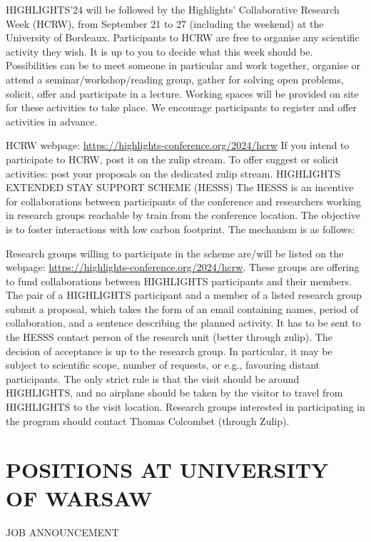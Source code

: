 \documentclass[prodmode,acmtecs]{acmsmall} %
\begin{document}
\begin{itemize}
  HIGHLIGHTS’24 will be followed by the Highlights’ Collaborative Research Week (HCRW), from September 21 to 27 (including the weekend) at the University of Bordeaux. Participants to HCRW are free to organise any scientific activity they wish. It is up to you to decide what this week should be. Possibilities can be to meet someone in particular and work together, organise or attend a seminar/workshop/reading group, gather for solving open problems, solicit, offer and participate in a lecture. Working spaces will be provided on site for these activities to take place. We encourage participants to register and offer activities in advance. 
 
  HCRW webpage: \href{https://highlights-conference.org/2024/hcrw}{https://highlights-conference.org/2024/hcrw} If you intend to participate to HCRW, post it on the zulip stream. To offer suggest or solicit activities: post your proposals on the dedicated zulip stream. HIGHLIGHTS EXTENDED STAY SUPPORT SCHEME (HESSS) The HESSS is an incentive for collaborations between participants of the conference and researchers working in research groups reachable by train from the conference location. The objective is to foster interactions with low carbon footprint. The mechanism is as follows: 
 
  Research groups willing to participate in the scheme are/will be listed on the webpage: \href{https://highlights-conference.org/2024/hcrw}{https://highlights-conference.org/2024/hcrw}. These groups are offering to fund collaborations between HIGHLIGHTS participants and their members. The pair of a HIGHLIGHTS participant and a member of a listed research group submit a proposal, which takes the form of an email containing names, period of collaboration, and a sentence describing the planned activity. It has to be sent to the HESSS contact person of the research unit (better through zulip). The decision of acceptance is up to the research group. In particular, it may be subject to scientific scope, number of requests, or e.g., favouring distant participants. The only strict rule is that the visit should be around HIGHLIGHTS, and no airplane should be taken by the visitor to travel from HIGHLIGHTS to the visit location. Research groups interested in participating in the program should contact Thomas Colcombet (through Zulip). 
 
\end{itemize}\section{POSITIONS AT UNIVERSITY OF WARSAW}\label{POSITIONSATUNIVERSITYOFWARSAW}JOB ANNOUNCEMENT 
\end{document}
